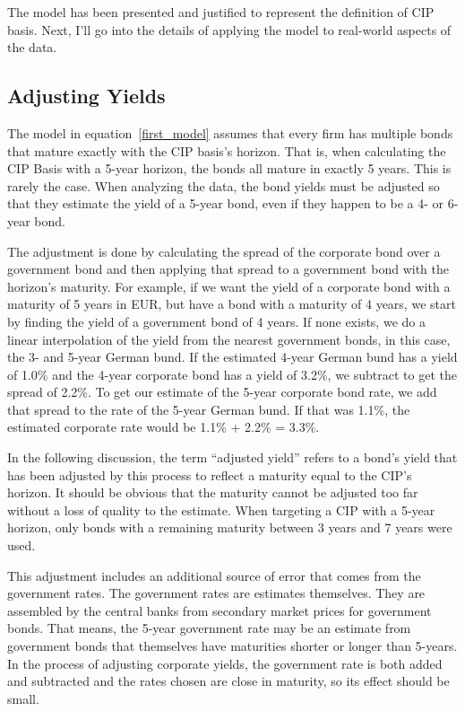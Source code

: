 The model has been presented and justified to represent the definition of CIP basis.  Next, I'll go into the details of applying the model to real-world aspects of the data.

\subsection{Adjusting Yields} \label{adjusting_yields} 


The model in equation~\eqref{first_model} assumes that every firm has multiple bonds that mature exactly with the CIP basis's horizon.  That is, when calculating the CIP Basis with a 5-year horizon, the bonds all mature in exactly 5 years.  This is rarely the case.  When analyzing the data, the bond yields must be adjusted so that they estimate the yield of a 5-year bond, even if they happen to be a 4- or 6-year bond.

The adjustment is done by calculating the spread of the corporate bond over a government bond and then applying that spread to a government bond with the horizon's maturity.  For example, if we want the yield of a corporate bond with a maturity of 5 years in EUR, but have a bond with a maturity of 4 years, we start by finding the yield of a government bond of 4 years.  If none exists, we do a linear interpolation of the yield from the nearest government bonds, in this case, the 3- and 5-year German bund.  If the estimated 4-year German bund has a yield of 1.0\% and the 4-year corporate bond has a yield of 3.2\%, we subtract to get the spread of 2.2\%.   To get our estimate of the 5-year corporate bond rate, we add that spread to the rate of the 5-year German bund.  If that was 1.1\%, the estimated corporate rate would be 1.1\% + 2.2\% = 3.3\%.  

In the following discussion, the term ``adjusted yield'' refers to a bond's yield that has been adjusted by this process to reflect a maturity equal to the CIP's horizon.  It should be obvious that the maturity cannot be adjusted too far without a loss of quality to the estimate.  When targeting a CIP with a 5-year horizon, only bonds with a remaining maturity between 3 years and 7 years were used.  


This adjustment includes an additional source of error that comes from the government rates.  The government rates are estimates themselves.  They are assembled by the central banks from secondary market prices for government bonds.  That means, the 5-year government rate may be an estimate from government bonds that themselves have maturities shorter or longer than 5-years.  In the process of adjusting corporate yields, the government rate is both added and subtracted and the rates chosen are close in maturity, so its effect should be small.

